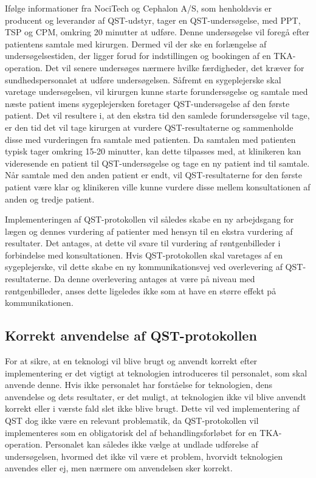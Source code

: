 Ifølge informationer fra NociTech og Cephalon A/S, som henholdsvis er producent og leverandør af QST-udstyr, tager en QST-undersøgelse, med PPT, TSP og CPM, omkring 20 minutter at udføre. Denne undersøgelse vil foregå efter patientens samtale med kirurgen. Dermed vil der ske en forlængelse af undersøgelsestiden, der ligger forud for indstillingen og bookingen af en TKA-operation.  Det vil senere undersøges nærmere hvilke færdigheder, det kræver for sundhedspersonalet at udføre undersøgelsen. Såfremt en sygeplejerske skal varetage undersøgelsen, vil kirurgen kunne starte forundersøgelse og samtale med næste patient imens sygeplejersken foretager QST-undersøgelse af den første patient. Det vil resultere i, at den ekstra tid den samlede forundersøgelse vil tage, er den tid det vil tage kirurgen at vurdere QST-resultaterne og sammenholde disse med vurderingen fra samtale med patienten. Da samtalen med patienten typisk tager omkring 15-20 minutter,  kan dette tilpasses med, at klinikeren kan videresende en patient til QST-undersøgelse og tage en ny patient ind til samtale. Når samtale med den anden patient er endt, vil QST-resultaterne for den første patient være klar og klinikeren ville kunne vurdere disse mellem konsultationen af anden og tredje patient.

Implementeringen af QST-protokollen vil således skabe en ny arbejdsgang for lægen og dennes vurdering af patienter med hensyn til en ekstra vurdering af resultater. Det antages, at dette vil svare til vurdering af røntgenbilleder i forbindelse med konsultationen.
Hvis QST-protokollen skal varetages af en sygeplejerske, vil dette skabe en ny kommunikationsvej ved overlevering af QST-resultaterne. Da denne overlevering antages at være på niveau med røntgenbilleder, anses dette ligeledes ikke som at have en større effekt på kommunikationen. 


\subsection{Korrekt anvendelse af QST-protokollen}
For at sikre, at en teknologi vil blive brugt og anvendt korrekt efter implementering er det vigtigt at teknologien introduceres til personalet, som skal anvende denne. Hvis ikke personalet har forståelse for teknologien, dens anvendelse og dets resultater, er det muligt, at teknologien ikke vil blive anvendt korrekt eller i værste fald slet ikke blive brugt. Dette vil ved implementering af QST dog ikke være en relevant problematik, da QST-protokollen vil implementeres som en obligatorisk del af behandlingsforløbet for en TKA-operation. Personalet kan således ikke vælge at undlade udførelse af undersøgelsen, hvormed det ikke vil være et problem, hvorvidt teknologien anvendes eller ej, men nærmere om anvendelsen sker korrekt. 

